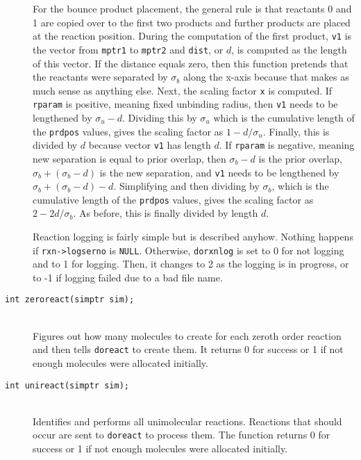 \documentclass {book}
\begin{document}
\begin{description}
For the bounce product placement, the general rule is that reactants 0 and 1 are copied over to the first two products and further products are placed at the reaction position. During the computation of the first product, \texttt{v1} is the vector from \texttt{mptr1} to \texttt{mptr2} and \texttt{dist}, or $d$, is computed as the length of this vector. If the distance equals zero, then this function pretends that the reactants were separated by $\sigma_b$ along the x-axis because that makes as much sense as anything else. Next, the scaling factor \texttt{x} is computed. If \texttt{rparam} is positive, meaning fixed unbinding radius, then \texttt{v1} needs to be lengthened by $\sigma_u-d$. Dividing this by $\sigma_u$ which is the cumulative length of the \texttt{prdpos} values, gives the scaling factor as $1-d/\sigma_u$. Finally, this is divided by $d$ because vector \texttt{v1} has length $d$. If \texttt{rparam} is negative, meaning new separation is equal to prior overlap, then $\sigma_b-d$ is the prior overlap, $\sigma_b+(\sigma_b-d)$ is the new separation, and \texttt{v1} needs to be lengthened by $\sigma_b+(\sigma_b-d)-d$. Simplifying and then dividing by $\sigma_b$, which is the cumulative length of the \texttt{prdpos} values, gives the scaling factor as $2-2d/\sigma_b$. As before, this is finally divided by length $d$.

Reaction logging is fairly simple but is described anyhow. Nothing happens if \texttt{rxn->logserno} is \texttt{NULL}. Otherwise, \texttt{dorxnlog} is set to 0 for not logging and to 1 for logging. Then, it changes to 2 as the logging is in progress, or to -1 if logging failed due to a bad file name.

\item[\texttt{int zeroreact(simptr sim);}]
\hfill \\
Figures out how many molecules to create for each zeroth order reaction and then tells \texttt{doreact} to create them. It returns 0 for success or 1 if not enough molecules were allocated initially.

\item[\texttt{int unireact(simptr sim);}]
\hfill \\
Identifies and performs all unimolecular reactions. Reactions that should occur are sent to \texttt{doreact} to process them. The function returns 0 for success or 1 if not enough molecules were allocated initially.


\end{description}
\end{document}

